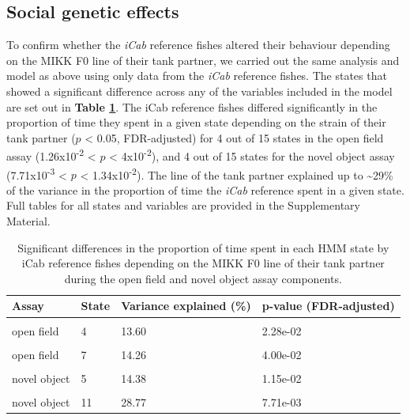 \documentclass[
]{book}
\begin{document}
\hypertarget{social-genetic-effects-1}{%
\subsection{Social genetic effects}\label{social-genetic-effects-1}}

To confirm whether the \emph{\textcolor{iCab_424B4D}{iCab}} reference fishes altered their behaviour depending on the MIKK F0 line of their tank partner, we carried out the same analysis and model as above using only data from the \emph{\textcolor{iCab_424B4D}{iCab}} reference fishes. The states that showed a significant difference across any of the variables included in the model are set out in \textbf{Table \ref{tab:mikk-sge-F0}}. The iCab reference fishes differed significantly in the proportion of time they spent in a given state depending on the strain of their tank partner (\(p\) \textless{} 0.05, FDR-adjusted) for 4 out of 15 states in the open field assay (1.26x10\textsuperscript{-2} \textless{} \(p\) \textless{} 4x10\textsuperscript{-2}), and 4 out of 15 states for the novel object assay (7.71x10\textsuperscript{-3} \textless{} \(p\) \textless{} 1.34x10\textsuperscript{-2}). The line of the tank partner explained up to \textasciitilde29\% of the variance in the proportion of time the \emph{\textcolor{iCab_424B4D}{iCab}} reference spent in a given state. Full tables for all states and variables are provided in the Supplementary Material.

\begin{table}

\caption{\label{tab:mikk-sge-F0}Significant differences in the proportion of time spent in each HMM state by iCab reference fishes depending on the MIKK F0 line of their tank partner during the open field and novel object assay components.}
\centering
\begin{tabular}[t]{llll}
\toprule
Assay & State & Variance explained (\%) & p-value (FDR-adjusted)\\
\midrule
\cellcolor{gray!6}{open field} & \cellcolor{gray!6}{3} & \cellcolor{gray!6}{14.93} & \cellcolor{gray!6}{2.10e-02}\\
open field & 4 & 13.60 & 2.28e-02\\
\cellcolor{gray!6}{open field} & \cellcolor{gray!6}{5} & \cellcolor{gray!6}{15.33} & \cellcolor{gray!6}{1.26e-02}\\
open field & 7 & 14.26 & 4.00e-02\\
\cellcolor{gray!6}{novel object} & \cellcolor{gray!6}{4} & \cellcolor{gray!6}{14.33} & \cellcolor{gray!6}{1.23e-02}\\
\addlinespace
novel object & 5 & 14.38 & 1.15e-02\\
\cellcolor{gray!6}{novel object} & \cellcolor{gray!6}{9} & \cellcolor{gray!6}{24.61} & \cellcolor{gray!6}{1.34e-02}\\
novel object & 11 & 28.77 & 7.71e-03\\
\bottomrule
\end{tabular}
\end{table}
\end{document}

